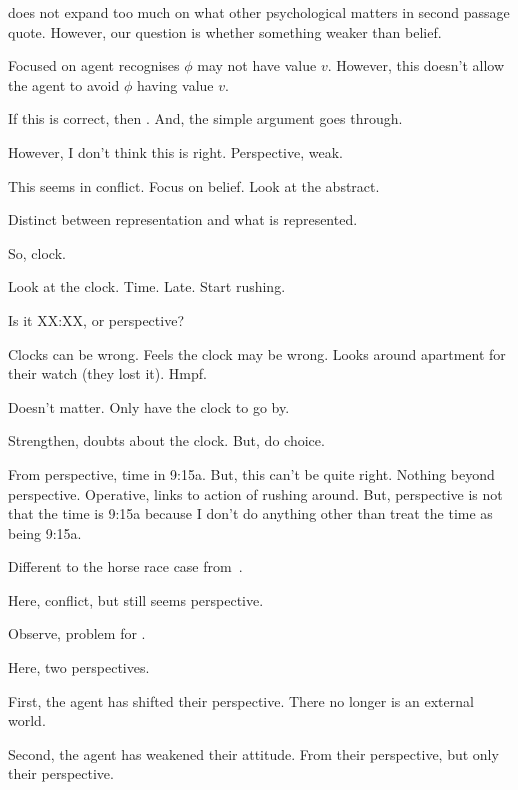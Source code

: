 \begin{note}
{  \citeauthor{Collins:1997wn} does not expand too much on what other psychological matters in second passage quote.
  However, our question is whether something weaker than belief.
  }

  Focused on agent recognises \(\phi\) may not have value \(v\).
  However, this doesn't allow the agent to avoid \(\phi\) having value \(v\).

  If this is correct, then \ptivity{}.
  And, the simple argument goes through.

  However, I don't think this is right.
  Perspective, weak.

  This seems in conflict.
  Focus on belief.
  Look at the abstract.
\end{note}

\begin{note}
  Distinct between representation and what is represented.

  So, clock.

  Look at the clock.
  Time.
  Late.
  Start rushing.

  Is it XX:XX, or perspective?

  Clocks can be wrong.
  Feels the clock may be wrong.
  Looks around apartment for their watch (they lost it).
  Hmpf.

  Doesn't matter.
  Only have the clock to go by.

  Strengthen, doubts about the clock.
  But, do choice.

  From perspective, time in 9:15a.
  But, this can't be quite right.
  Nothing beyond perspective.
  Operative, links to action of rushing around.
  But, perspective is not that the time is 9:15a because I don't do anything other than treat the time as being 9:15a.
\end{note}

\begin{note}
  Different to the horse race case from~\textcite{Hawthorne:2016wv}.

  Here, conflict, but still seems perspective.
\end{note}

\begin{note}
  Observe, problem for \citeauthor{Descartes:1996vp}.

  Here, two perspectives.

  First, the agent has shifted their perspective.
  There no longer is an external world.

  Second, the agent has weakened their attitude.
  From their perspective, but only their perspective.
\end{note}

